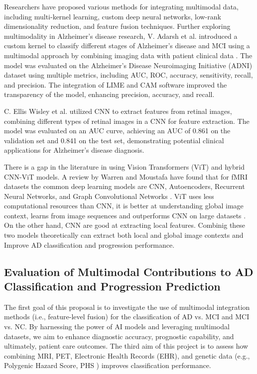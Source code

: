 Researchers have proposed various methods for integrating multimodal data, including multi-kernel learning, custom deep neural networks, low-rank dimensionality reduction, and feature fusion techniques. Further exploring multimodality in Alzheimer's disease research, V. Adarsh et al. introduced a custom kernel to classify different stages of Alzheimer’s disease and MCI using a multimodal approach by combining imaging data with patient clinical data \cite{adarsh_multimodal_2024}. The model was evaluated on the Alzheimer’s Disease Neuroimaging Initiative (ADNI) dataset using multiple metrics, including AUC, ROC, accuracy, sensitivity, recall, and precision. The integration of LIME and CAM software improved the transparency of the model, enhancing precision, accuracy, and recall.

C. Ellis Wisley et al. \cite{wisely_convolutional_2022} utilized CNN to extract features from retinal images, combining different types of retinal images in a CNN for feature extraction. The model was evaluated on an AUC curve, achieving an AUC of 0.861 on the validation set and 0.841 on the test set, demonstrating potential clinical applications for Alzheimer's disease diagnosis. 

There is a gap in the literature in using Vision Transformers (ViT) and hybrid CNN-ViT models. A review by Warren and Moustafa have found that for fMRI datasets the common deep learning models are CNN, Autoencoders, Recurrent Neural Networks, and Graph Convolutional Networks \cite{warren_functional_2023}. ViT uses less computational resources than CNN, it is better at understanding global image context, learns from image sequences and outperforms CNN on large datasets \cite{dosovitskiy_image_2021}. On the other hand, CNN are good at extracting local features. Combinig these two models theoretically can extract both local and global image contexts and Improve AD classification and progression performance. 

\subsection{Evaluation of Multimodal Contributions to AD Classification and Progression Prediction}
The first goal of this proposal is to investigate the use of multimodal integration methods (i.e., feature-level fusion) for the classification of AD vs. MCI and MCI vs. NC. By harnessing the power of AI models and leveraging multimodal datasets, we aim to enhance diagnostic accuracy, prognostic capability, and ultimately, patient care outcomes. The third aim of this project is to assess how combining MRI, PET, Electronic Health Records (EHR), and genetic data (e.g., Polygenic Hazard Score, PHS \cite{desikan_genetic_2017}) improves classification performance.

